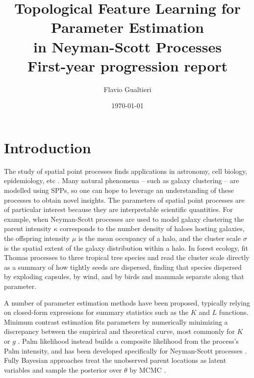 \documentclass[11pt,a4paper]{article}
\title{Topological Feature Learning for Parameter Estimation\\
       in Neyman-Scott Processes\\[4pt]
       \large First-year progression report}
\author{Flavio Gualtieri}
\date{\today}
\begin{document}
\maketitle

\section{Introduction}
\label{sec:intro}

The study of spatial point processes finds applications in astronomy, cell
biology, epidemiology, etc \citep{moller2004statistical}. Many natural phenomena
-- such as galaxy clustering -- are modelled using SPPs, so one can hope to
leverage an understanding of these processes to obtain novel insights. The
parameters of spatial point processes are of particular interest because they
are interpretable scientific quantities. For example, when Neyman-Scott
processes are used to model galaxy clustering the parent intensity $\kappa$
corresponds to the number density of haloes hosting galaxies, the offspring
intensity $\mu$ is the mean occupancy of a halo, and the cluster scale $\sigma$
is the spatial extent of the galaxy distribution within a halo. In forest
ecology, \citet{waagepetersen2009twostep} fit Thomas processes to three tropical
tree species and read the cluster scale directly as a summary of how tightly
seeds are dispersed, finding that species dispersed by exploding capsules, by
wind, and by birds and mammals separate along that parameter.

A number of parameter estimation methods have been proposed, typically relying
on closed-form expressions for summary statistics such as the $K$ and $L$
functions. Minimum contrast estimation fits parameters by numerically minimizing
a discrepancy between the empirical and theoretical curve, most commonly for $K$
or $g$ \citep{diggle2003spatial}. Palm likelihood instead builds a composite
likelihood from the process's Palm intensity, and has been developed
specifically for Neyman-Scott processes \citep{tanaka2008parameter}. Fully
Bayesian approaches treat the unobserved parent locations as latent variables
and sample the posterior over $\theta$ by MCMC \citep{moller2004statistical}.
\end{document}
